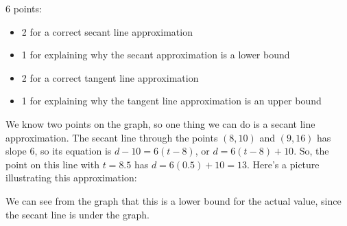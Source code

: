 \documentclass{article}
\begin{document}
\begin{enumerate}
\begin{enumerate}
    \begin{grading} 
      6 points: 
      \begin{itemize}[nosep]
      \item 2 for a correct secant line approximation
      \item 1 for explaining why the secant approximation is a lower bound
      \item 2 for a correct tangent line approximation
      \item 1 for explaining why the tangent line approximation is an upper bound 
      \end{itemize} 
    \end{grading} 

    \begin{solution} 
      We know two points on the graph, so one thing we can do is a secant line approximation. The secant line through the points $(8, 10)$ and $(9, 16)$ has slope 6, so its equation is $d - 10 = 6 (t - 8)$, or $d = 6 (t - 8) + 10$. So, the point on this line with $t = 8.5$ has $d = 6 (0.5) + 10 = 13$. Here's a picture illustrating this approximation:
      \begin{center}
      \end{center}
      We can see from the graph that this is a lower bound for the actual value, since the secant line is under the graph. 


\end{solution}
\end{enumerate}
\end{enumerate}
\end{document}
